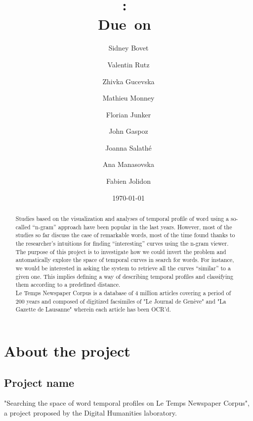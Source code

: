 \documentclass{article}
\title{
\vspace{2in}
\textmd{\textbf{\hmwkClass:\ \hmwkTitle}}\\
\normalsize\vspace{0.1in}\small{Due\ on\ \hmwkDueDate}\\
\vspace{3in}
}
\author{Sidney Bovet \and Valentin Rutz \and Zhivka Gucevska  \and Mathieu Monney\and Florian Junker\and John Gaspoz\and Joanna Salathé\and Ana Manasovska\and Fabien Jolidon}
\date{\today} %
\begin{document}
\maketitle



\newpage
\tableofcontents
\newpage

\begin{abstract}

Studies based on the visualization and analyses of temporal profile of word using a so-called “n-gram” approach have been popular in the last years. However, most of the studies so far discuss the case of remarkable words, most of the time found thanks to the researcher’s intuitions for finding “interesting” curves using the n-gram viewer.\\
The purpose of this project is to investigate how we could invert the problem and automatically explore the space of temporal curves in search for words. For instance, we would be interested in asking the system to retrieve all the curves “similar” to a given one. This implies defining a way of describing temporal profiles and classifying them according to a predefined distance. \\
Le Temps Newspaper Corpus is a database of 4 million articles covering a period of 200 years and composed of digitized facsimiles of "Le Journal de Genève" and "La Gazette de Lausanne" wherein each article has been OCR'd. \\

\end{abstract}
\newpage

\section{About the project}
\subsection{Project name}
"Searching the space of word temporal profiles on Le Temps Newspaper Corpus", a project proposed by the Digital Humanities laboratory.
\end{document}

